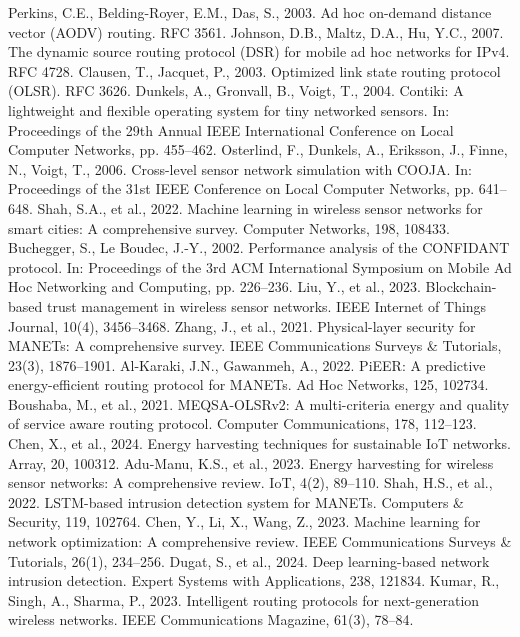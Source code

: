 \documentclass[preprint]{elsarticle}
\begin{document}
\begin{thebibliography}{30}
 Perkins, C.E., Belding-Royer, E.M., Das, S., 2003. Ad hoc on-demand distance vector (AODV) routing. RFC 3561.
 Johnson, D.B., Maltz, D.A., Hu, Y.C., 2007. The dynamic source routing protocol (DSR) for mobile ad hoc networks for IPv4. RFC 4728.
 Clausen, T., Jacquet, P., 2003. Optimized link state routing protocol (OLSR). RFC 3626.
 Dunkels, A., Gronvall, B., Voigt, T., 2004. Contiki: A lightweight and flexible operating system for tiny networked sensors. In: Proceedings of the 29th Annual IEEE International Conference on Local Computer Networks, pp. 455--462.
 Osterlind, F., Dunkels, A., Eriksson, J., Finne, N., Voigt, T., 2006. Cross-level sensor network simulation with COOJA. In: Proceedings of the 31st IEEE Conference on Local Computer Networks, pp. 641--648.
 Shah, S.A., et al., 2022. Machine learning in wireless sensor networks for smart cities: A comprehensive survey. Computer Networks, 198, 108433.
 Buchegger, S., Le Boudec, J.-Y., 2002. Performance analysis of the CONFIDANT protocol. In: Proceedings of the 3rd ACM International Symposium on Mobile Ad Hoc Networking and Computing, pp. 226--236.
 Liu, Y., et al., 2023. Blockchain-based trust management in wireless sensor networks. IEEE Internet of Things Journal, 10(4), 3456--3468.
 Zhang, J., et al., 2021. Physical-layer security for MANETs: A comprehensive survey. IEEE Communications Surveys \& Tutorials, 23(3), 1876--1901.
 Al-Karaki, J.N., Gawanmeh, A., 2022. PiEER: A predictive energy-efficient routing protocol for MANETs. Ad Hoc Networks, 125, 102734.
 Boushaba, M., et al., 2021. MEQSA-OLSRv2: A multi-criteria energy and quality of service aware routing protocol. Computer Communications, 178, 112--123.
 Chen, X., et al., 2024. Energy harvesting techniques for sustainable IoT networks. Array, 20, 100312.
 Adu-Manu, K.S., et al., 2023. Energy harvesting for wireless sensor networks: A comprehensive review. IoT, 4(2), 89--110.
 Shah, H.S., et al., 2022. LSTM-based intrusion detection system for MANETs. Computers \& Security, 119, 102764.
 Chen, Y., Li, X., Wang, Z., 2023. Machine learning for network optimization: A comprehensive review. IEEE Communications Surveys \& Tutorials, 26(1), 234--256.
 Dugat, S., et al., 2024. Deep learning-based network intrusion detection. Expert Systems with Applications, 238, 121834.
 Kumar, R., Singh, A., Sharma, P., 2023. Intelligent routing protocols for next-generation wireless networks. IEEE Communications Magazine, 61(3), 78--84.

\end{thebibliography}
\end{document}
